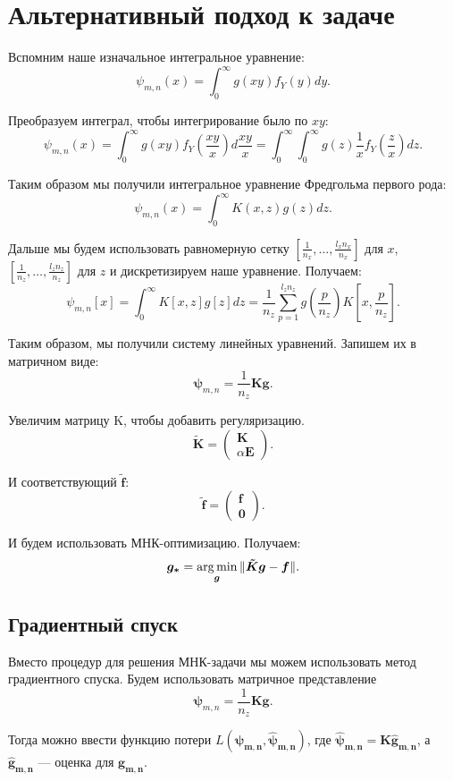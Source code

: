 \documentclass[../paper.tex]{subfiles}
\begin{document}
\chapter{Альтернативный подход к задаче}
Вспомним наше изначальное интегральное уравнение:
\[
    \psi_{m,n}(x) = \int_{0}^{\infty} g(xy) f_Y(y) dy  
.\]

Преобразуем интеграл, чтобы интегрирование было по $xy$:
\[
    \psi_{m,n}(x) = \int_{0}^{\infty}  g(xy) f_Y(\frac{xy}{x}) d\frac{xy}{x}
    = \int_{0}^{\infty} \int_{0}^{\infty} g(z) \frac{1}{x} f_Y(\frac{z}{x}) dz  
.\]

Таким образом мы получили интегральное уравнение Фредгольма первого рода:
\[
    \psi_{m,n}(x) = \int_{0}^{\infty} K(x, z) g(z) dz 
.\]

Дальше мы будем использовать равномерную сетку $\left[\frac{1}{n_x}, \dots, \frac{l_x n_x}{n_x}\right]$ для $x$, $\left[\frac{1}{n_z}, \dots, \frac{l_z n_z}{n_z}\right]$ для $z$ 
и дискретизируем наше уравнение. Получаем:
\[
    \psi_{m,n}[x] = \int_{0}^{\infty} K[x,z] g[z] dz = \frac{1}{n_z} \sum_{p=1}^{l_z n_z} g\left(\frac{p}{n_z}\right) K\left[x, \frac{p}{n_z}\right]
.\]

Таким образом, мы получили систему линейных уравнений. Запишем их в матричном виде:
\[
    \bm{\psi}_{m,n} = \frac{1}{n_z} \bm{K} \bm{g}
.\]

Увеличим матрицу K, чтобы добавить регуляризацию.
\[
    \bm{\tilde K} = 
    \begin{pmatrix}
        \bm{K} \\
        \alpha \bm{E}
    \end{pmatrix}
.\]

И соответствующий $\bm{\tilde f}$:
\[
    \bm{\tilde f} = 
    \begin{pmatrix}
        \bm{f} \\
        \bm{0}
    \end{pmatrix}
.\]

И будем использовать МНК-оптимизацию. Получаем:
\[
    \bm{g_*} = \operatorname*{arg\,min}_{\bm{g}} \| \bm{\tilde K} \bm{g} - \bm{f} \|
.\]
%
\section{Градиентный спуск}
Вместо процедур для решения МНК-задачи мы можем использовать метод градиентного
спуска. Будем использовать матричное представление
\[
  \bm{\psi}_{m,n} = \frac{1}{n_z} \bm{K} \bm{g}
.\]

Тогда можно ввести функцию потери $L(\bm{\psi_{m,n}}, \bm{\hat{\psi}_{m,n}})$,
где $\bm{\hat{\psi}_{m,n}} = \bm{K} \bm{\hat{g}_{m,n}}$, а $\bm{\hat{g}_{m,n}}$ ---
оценка для $\bm{g_{m,n}}$.
\end{document}
